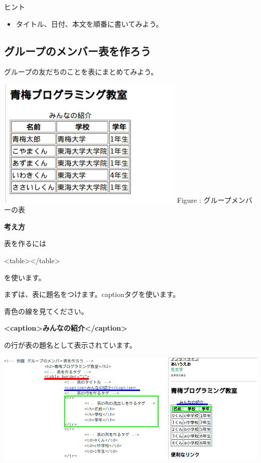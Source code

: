 \documentclass[a4paper,12pt]{jarticle}
\begin{document}
ヒント

\begin{itemize}
  \item
        タイトル、日付、本文を順番に書いてみよう。
\end{itemize}
\clearpage
{}
\subsection{\theExercise グループのメンバー表を作ろう}
グループの友だちのことを表にまとめてみよう。

\centering
\begin{minipage}{8.998cm}
  {\upshape
    \includegraphics[width=8.998cm,height=6.234cm]{textbook-img189.png}
    \newline
    Figure : グループメンバーの表}
\end{minipage}

\bigskip

\flushleft
\textbf{考え方}



表を作るには

{\textless}table{\textgreater}{\textless}/table{\textgreater}

を使います。

まずは、表に題名をつけます。captionタグを使います。

青色の線を見てください。

\textbf{{\textless}caption{\textgreater}みんなの紹介{\textless}/caption{\textgreater}}

の行が表の題名として表示されています。



\bigskip

\includegraphics[width=13.462cm,height=5.387cm]{textbook-img190.png}
\end{document}
